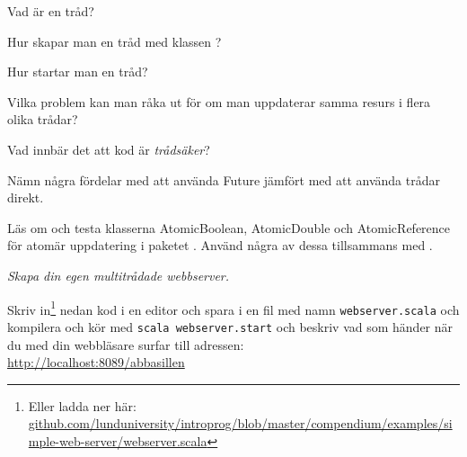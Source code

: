 \Subtask Vad är en tråd?

\Subtask Hur skapar man en tråd med klassen ?

\Subtask Hur startar man en tråd?

\Subtask Vilka problem kan man råka ut för om man uppdaterar samma resurs i flera olika trådar? 

\Subtask Vad innbär det att kod är \emph{trådsäker}?

\Subtask Nämn några fördelar med att använda Future jämfört med att använda trådar direkt.


\Task Läs om och testa klasserna AtomicBoolean, AtomicDouble och AtomicReference för atomär uppdatering i paketet . Använd några av dessa tillsammans med . 



\newpage


\AdvancedTasks %

\Task \emph{Skapa din egen multitrådade webbserver.} 

\Subtask Skriv in\footnote{Eller ladda ner här: \href{https://github.com/lunduniversity/introprog/blob/master/compendium/examples/simple-web-server/webserver.scala}{github.com/lunduniversity/introprog/blob/master/compendium/examples/simple-web-server/webserver.scala}} nedan kod i en editor och spara i en fil med namn \texttt{webserver.scala} och kompilera och kör med \texttt{scala webserver.start} och beskriv vad som händer när du med din webbläsare surfar till adressen: \\ \url{http://localhost:8089/abbasillen}


